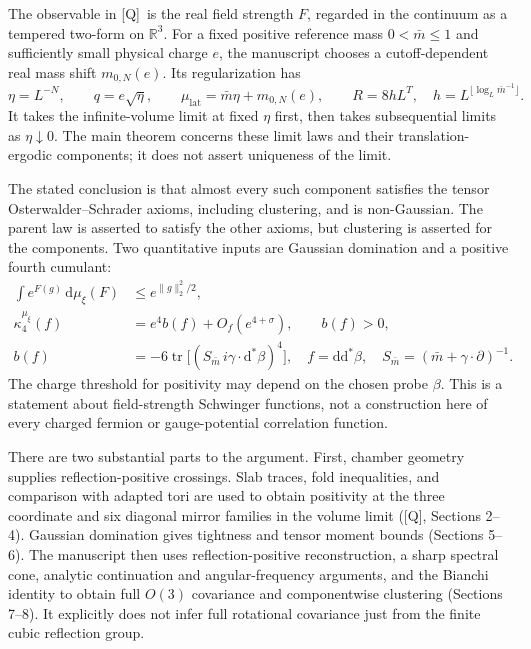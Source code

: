 \documentclass[11pt]{article}
\numberwithin{equation}{section}
\newcommand{\R}{\mathbb R}
\newcommand{\dd}{\mathrm d}
\newcommand{\tr}{\operatorname{tr}}
\newcommand{\Q}{\textup{[Q]}}
\begin{document}
The observable in \Q\ is the real field strength $F$, regarded in the
continuum as a tempered two-form on $\R^3$. For a fixed positive reference
mass $0<\bar m\le1$ and sufficiently small physical charge $e$, the
manuscript chooses a cutoff-dependent real mass shift $m_{0,N}(e)$.
Its regularization has
\begin{equation}
 \eta=L^{-N},\qquad q=e\sqrt\eta,\qquad
 \mu_{\mathrm{lat}}=\bar m\eta+m_{0,N}(e),\qquad
 R=8hL^T,\quad h=L^{\lfloor\log_L\bar m^{-1}\rfloor}.
\end{equation}
It takes the infinite-volume limit at fixed $\eta$ first, then takes
subsequential limits as $\eta\downarrow0$. The main theorem concerns
these limit laws and their translation-ergodic components; it does not
assert uniqueness of the limit.

The stated conclusion is that almost every such component satisfies
the tensor Osterwalder--Schrader axioms, including clustering, and is
non-Gaussian. The parent law is asserted to satisfy the other axioms,
but clustering is asserted for the components. Two quantitative inputs
are Gaussian domination and a positive fourth cumulant:
\begin{align}
 \int e^{F(g)}\,\dd\mu_\xi(F)&\le e^{\|g\|_2^2/2},\\
 \kappa_4^{\mu_\xi}(f)&=e^4b(f)+O_f(e^{4+\sigma}),\qquad b(f)>0,
 \label{eq:digest-cumulant}\\
 b(f)&=-6\tr\big[(S_{\bar m}\,i\gamma\cdot\dd^*\beta)^4\big],
 \quad f=\dd\dd^*\beta,
 \quad S_{\bar m}=(\bar m+\gamma\cdot\partial)^{-1}.
\end{align}
The charge threshold for positivity may depend on the chosen probe
$\beta$. This is a statement about field-strength Schwinger functions,
not a construction here of every charged fermion or gauge-potential
correlation function.

There are two substantial parts to the argument.
First, chamber geometry supplies reflection-positive crossings.
Slab traces, fold inequalities, and comparison with adapted tori are
used to obtain positivity at the three coordinate and six diagonal
mirror families in the volume limit (\Q, Sections 2--4).
Gaussian domination gives tightness and tensor moment bounds
(Sections 5--6). The manuscript then uses reflection-positive
reconstruction, a sharp spectral cone, analytic continuation and
angular-frequency arguments, and the Bianchi identity to obtain full
$O(3)$ covariance and componentwise clustering (Sections 7--8).
It explicitly does not infer full rotational covariance just from the
finite cubic reflection group.
\end{document}

